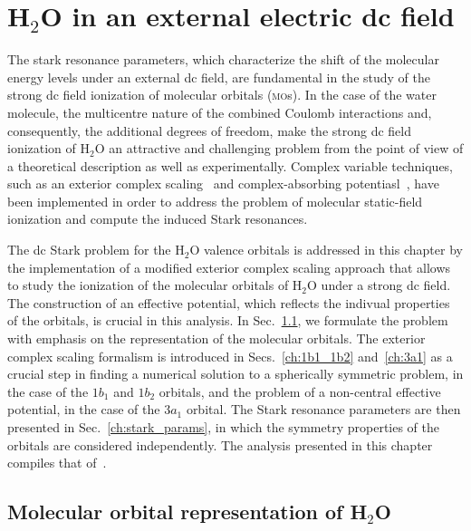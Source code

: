 \chapter{H$_{2}$O in an external electric dc field}
\label{cha:dc_h2o}


The stark resonance parameters, which characterize the shift of the
molecular energy levels under an external dc field, are fundamental in
the study of the strong dc field ionization of molecular orbitals
(\textsc{mo}s). In the case of the water molecule, the multicentre
nature of the combined Coulomb interactions and, consequently, the
additional degrees of freedom, make the strong dc field ionization of
H$_{2}$O an attractive and challenging problem from the point of view
of a theoretical description as well as experimentally. Complex
variable techniques, such as an exterior complex
scaling~\cite{Simon_1979,Scrinzi_2010} and complex-absorbing
potentiasl~\cite{RissMeyer_1993,Krause_2014}, have been implemented in
order to address the problem of molecular static-field ionization and
compute the induced Stark resonances.

The dc Stark problem for the H$_{2}$O valence orbitals is addressed in
this chapter by the implementation of a modified exterior complex
scaling approach that allows to study the ionization of the molecular
orbitals of H$_{2}$O under a strong dc field. The construction of an
effective potential, which reflects the indivual properties of the
orbitals, is crucial in this analysis. In Sec.~\ref{ch:h2o_structure},
we formulate the problem with emphasis on the representation of the
molecular orbitals. The exterior complex scaling formalism is
introduced in Secs.~\ref{ch:1b1_1b2} and~\ref{ch:3a1} as a crucial
step in finding a numerical solution to a spherically symmetric
problem, in the case of the $1b_{1}$ and $1b_{2}$ orbitals, and the
problem of a non-central effective potential, in the case of the
$3a_{1}$ orbital. The Stark resonance parameters are then presented in
Sec.~\ref{ch:stark_params}, in which the symmetry properties of the
orbitals are considered independently. The analysis presented in this
chapter compiles that of~\cite{sarias_2016,sarias_2017}.


\section{Molecular orbital representation of H$_{2}$O}
\label{ch:h2o_structure}

